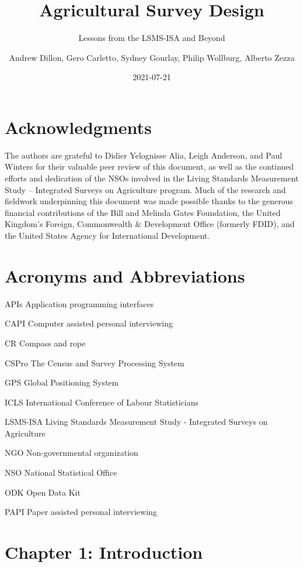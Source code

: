 \documentclass[
]{book}
\title{Agricultural Survey Design}
\subtitle{Lessons from the LSMS-ISA and Beyond}
\author{Andrew Dillon, Gero Carletto, Sydney Gourlay, Philip Wollburg, Alberto Zezza}
\date{2021-07-21}
\begin{document}
\maketitle

{
\setcounter{tocdepth}{1}
\tableofcontents
}
\hypertarget{acknowledgments}{%
\chapter*{Acknowledgments}\label{acknowledgments}}

The authors are grateful to Didier Yelognisse Alia, Leigh Anderson, and Paul Winters for their valuable peer review of this document, as well as the continued efforts and dedication of the NSOs involved in the Living Standards Measurement Study -- Integrated Surveys on Agriculture program. Much of the research and fieldwork underpinning this document was made possible thanks to the generous financial contributions of the Bill and Melinda Gates Foundation, the United Kingdom's Foreign, Commonwealth \& Development Office (formerly FDID), and the United States Agency for International Development.

\hypertarget{acronyms-and-abbreviations}{%
\chapter*{Acronyms and Abbreviations}\label{acronyms-and-abbreviations}}

APIs Application programming interfaces

CAPI Computer assisted personal interviewing

CR Compass and rope

CSPro The Census and Survey Processing System

GPS Global Positioning System

ICLS International Conference of Labour Statisticians

LSMS-ISA Living Standards Measurement Study - Integrated Surveys on Agriculture

NGO Non-governmental organization

NSO National Statistical Office

ODK Open Data Kit

PAPI Paper assisted personal interviewing

\hypertarget{chapter-1-introduction}{%
\chapter{Chapter 1: Introduction}\label{chapter-1-introduction}}
\end{document}
